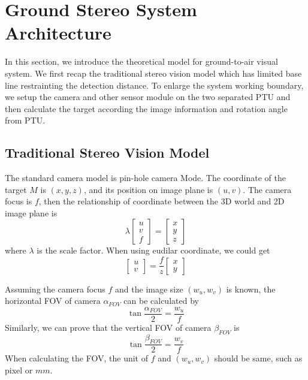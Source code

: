  

\section{Ground Stereo System Architecture}
In this section, we introduce the theoretical model for ground-to-air visual system. We first recap the traditional stereo vision model which has limited base line restrainting the detection distance. To enlarge the system working boundary, we setup the camera and other sensor module on the two separated PTU and then calculate the target according the image information and rotation angle from PTU.

\subsection{Traditional Stereo Vision Model}
The standard camera model is pin-hole camera Mode. The coordinate of the target $M$ is $(x,y,z)$, and its position on image plane is $(u,v)$. The camera focus is $f$, then the relationship of coordinate between the 3D world and 2D image plane is 
\begin{equation}
\lambda\left[ {\begin{array}{*{20}{c}}
	u \\ 
	v \\ 
	f 
	\end{array}} \right] =\left[ {\begin{array}{*{20}{c}}
	x \\ 
	y \\ 
	z 
	\end{array}} \right]
\end{equation}
where $\lambda$ is the scale factor. When using eudilar coordinate, we could get
\begin{equation}
\left[ {\begin{array}{*{20}{c}}
	u \\ 
	v 
	\end{array}} \right] =\frac{f}{z} \left[ {\begin{array}{*{20}{c}}
	x \\ 
	y   
	\end{array}} \right]
\end{equation}

Assuming the camera focus $f$ and the image size $(w_u,w_v)$ is known, the horizontal FOV of camera $\alpha_{FOV}$ can be calculated by
\begin{equation}
\tan{\frac{\alpha_{FOV}}{2}}=\frac{w_u}{f}
\end{equation}
Similarly, we can prove that the vertical FOV of camera $\beta_{FOV}$ is
\begin{equation}
\tan{\frac{\beta_{FOV}}{2}}=\frac{w_v}{f}
\end{equation}
When calculating the FOV, the unit of $f$ and $(w_u,w_v)$ should be same, such as pixel or $mm$.

